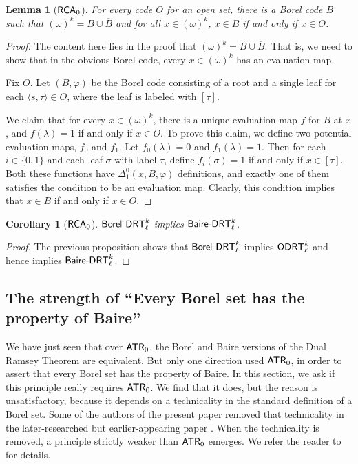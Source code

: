 \documentclass{amsart}
\newtheorem{lem}[thm]{Lemma}
\newtheorem{cor}[thm]{Corollary}
\theoremstyle{definition}
\theoremstyle{remark}
\newcommand{\system}[1]{\mbox{\fontfamily{cmss}\fontshape{n}\fontseries{m}%
    \selectfont#1}}
\newcommand{\RCA}{\system{RCA}\ensuremath{_0}}
\newcommand{\ATR}{\system{ATR}\ensuremath{_0}}
\newcommand{\BoDRT}{\system{Borel-DRT}}
\newcommand{\BaDRT}{\system{Baire-DRT}}
\newcommand{\ODRT}{\system{ODRT}}
\begin{document}
\begin{lem}[$\RCA$]
For every code $O$ for an open set, there is a Borel code $B$ such that $(\omega)^k = B \cup \overline{B}$ and for all $x \in (\omega)^k$, $x \in B$ if and only if 
$x \in O$. 
\end{lem}

\begin{proof}
The content here lies in the proof that $(\omega)^k = B \cup \overline{B}$.  That is,
we need to show that in the obvious Borel code, 
every $x \in (\omega)^k$ has an evaluation map.

Fix $O$. Let $(B,\varphi)$ be the Borel code consisting of a root and a single leaf
for each $\langle s, \tau\rangle \in O$, where the leaf is labeled with $[\tau]$.

 We claim that for every $x \in (\omega)^k$, there is a unique evaluation map 
 $f$ for $B$ at $x$, and 
$f(\lambda) = 1$ if and only if $x \in O$. To prove this claim, we define two 
potential evaluation maps, $f_0$ and $f_1$. 
Let $f_0(\lambda) = 0$ and $f_1(\lambda)=1$.  Then for each $i\in \{0,1\}$ 
and each leaf $\sigma$ with label $\tau$, define $f_i(\sigma) = 1$ if 
and only if $x \in [\tau]$. Both these functions have $\Delta^0_1(x,B,\varphi)$
definitions, and exactly one of them satisfies the condition to be 
an evaluation map.  Clearly, this condition implies that $x \in B$ 
if and only if $x \in O$.
\end{proof}


\begin{cor}[$\RCA$]
$\BoDRT^k_{\ell}$ implies $\BaDRT^k_{\ell}$. 
\end{cor}
\begin{proof} The previous proposition shows that
$\BoDRT^k_{\ell}$ implies $\ODRT^k_{\ell}$ and hence implies $\BaDRT^k_{\ell}$. 
\end{proof}




\subsection{The strength of ``Every Borel set has the property of Baire''}

We have just seen that over $\ATR$, the Borel and Baire versions
of the Dual Ramsey Theorem are equivalent.  But only one 
direction used $\ATR$, in order to assert that every Borel set 
has the property of Baire.  In this section, we ask if this principle 
really requires $\ATR$.  We find that it does, but the reason
is unsatisfactory, because it depends
on a technicality in the standard definition of a Borel
set.  Some of the authors of the present paper removed that 
technicality in the later-researched but earlier-appearing paper 
\cite{ADMSW}.  When the technicality is removed, a principle 
strictly weaker than $\ATR$ emerges.  
We refer the reader to \cite{ADMSW}
for details.
\end{document}
